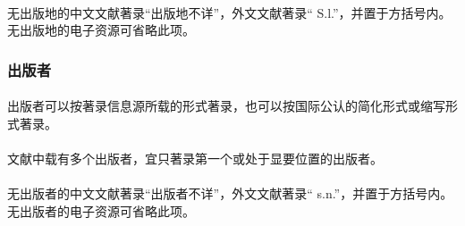 \documentclass[twoside]{article}%
\begin{document}
\begin{refsection}
\nocite{egbookpubaddressc--}
\nocite{egbookpubaddressd--}


{}
\end{refsection}

\paragraph{} 无出版地的中文文献著录“出版地不详”，外文文献著录“ S.l.”，并置于方括号内。无出版地的电子资源可省略此项。

\begin{refsection}

\nocite{egbookpubaddresse--}
\nocite{egbookpubaddressf--}
\nocite{egbookpubaddressg--}

{}
\end{refsection}


\subsubsection{出版者}

\paragraph{}\label{sec:pub:short} 出版者可以按著录信息源所载的形式著录，也可以按国际公认的简化形式或缩写形式著录。

\begin{refsection}
\nocite{egbookpubpublishera--}
\nocite{egbookpubpublisherb--}
\nocite{egbookpubpublisherc--}

{}
\end{refsection}

\paragraph{} 文献中载有多个出版者，宜只著录第一个或处于显要位置的出版者。


\begin{refsection}
\nocite{egbookpubpublisherd--}

{}
\end{refsection}

\paragraph{} 无出版者的中文文献著录“出版者不详”，外文文献著录“ s.n.”，并置于方括号内。无出版者的电子资源可省略此项。
\end{document}

